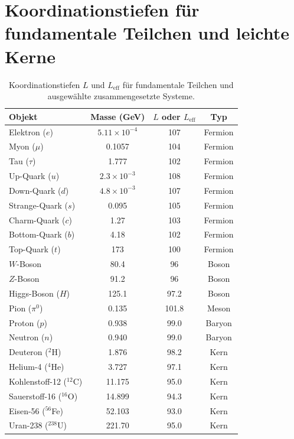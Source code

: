 \documentclass[11pt,a4paper]{article}
\begin{document}
	\section*{Koordinationstiefen für fundamentale Teilchen und leichte Kerne}
	\begin{table}[H]
		\centering
		\caption{Koordinationstiefen \(L\) und \(L_{\mathrm{eff}}\) für fundamentale Teilchen und ausgewählte zusammengesetzte Systeme.}
		\label{tab:depths_particles}
		\small
		\begin{tabular}{l c c c}
			\toprule
			\textbf{Objekt} & \textbf{Masse (GeV)} & \textbf{\(L\) oder \(L_{\mathrm{eff}}\)} & \textbf{Typ} \\
			\midrule
			Elektron (\(e\)) & \(5.11\times10^{-4}\) & 107 & Fermion \\
			Myon (\(\mu\)) & 0.1057 & 104 & Fermion \\
			Tau (\(\tau\)) & 1.777 & 102 & Fermion \\
			Up-Quark (\(u\)) & \(2.3\times10^{-3}\) & 108 & Fermion \\
			Down-Quark (\(d\)) & \(4.8\times10^{-3}\) & 107 & Fermion \\
			Strange-Quark (\(s\)) & 0.095 & 105 & Fermion \\
			Charm-Quark (\(c\)) & 1.27 & 103 & Fermion \\
			Bottom-Quark (\(b\)) & 4.18 & 102 & Fermion \\
			Top-Quark (\(t\)) & 173 & 100 & Fermion \\
			\(W\)-Boson & 80.4 & 96 & Boson \\
			\(Z\)-Boson & 91.2 & 96 & Boson \\
			Higgs-Boson (\(H\)) & 125.1 & 97.2 & Boson \\
			Pion (\(\pi^0\)) & 0.135 & 101.8 & Meson \\
			Proton (\(p\)) & 0.938 & 99.0 & Baryon \\
			Neutron (\(n\)) & 0.940 & 99.0 & Baryon \\
			Deuteron (\(^2\)H) & 1.876 & 98.2 & Kern \\
			Helium-4 (\(^4\)He) & 3.727 & 97.1 & Kern \\
			Kohlenstoff-12 (\(^{12}\)C) & 11.175 & 95.0 & Kern \\
			Sauerstoff-16 (\(^{16}\)O) & 14.899 & 94.3 & Kern \\
			Eisen-56 (\(^{56}\)Fe) & 52.103 & 93.0 & Kern \\
			Uran-238 (\(^{238}\)U) & 221.70 & 95.0 & Kern \\
			\bottomrule
		\end{tabular}
	\end{table}
	
\end{document}
